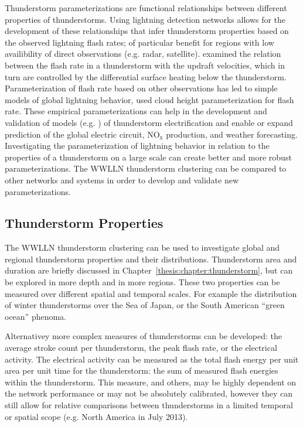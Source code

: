 Thunderstorm parameterizations are functional relationships between different properties of thunderstorms.
Using lightning detection networks allows for the development of these relationships that infer thunderstorm properties based on the observed lightning flash rates; of particular benefit for regions with low availibility of direct observations (e.g. radar, satellite).
\citet{Zipser1994} examined the relation between the flash rate in a thunderstorm with the updraft velocities, which in turn are controlled by the differential surface heating below the thunderstorm.
Parameterization of flash rate based on other observations has led to simple models of global lightning behavior, \citet{Price1992} used cloud height parameterization for flash rate.
These empirical parameterizations can help in the development and validation of models (e.g. \citet{Baker1999}) of thunderstorm electrification and enable or expand prediction of the global electric circuit, NO$_\text{x}$ production, and weather forecasting.
Investigating the parameterization of lightning behavior in relation to the properties of a thunderstorm on a large scale can create better and more robust parameterizations.
The WWLLN thunderstorm clustering can be compared to other networks and systems in order to develop and validate new parameterizations.

\subsection{Thunderstorm Properties}

The WWLLN thunderstorm clustering can be used to investigate global and regional thunderstorm properties and their distributions.
Thunderstorm area and duration are briefly discussed in Chapter~\ref{thesis:chapter:thunderstorm}, but can be explored in more depth and in more regions.
These two properties can be measured over different spatial and temporal scales.
For example the distribution of winter thunderstorms over the Sea of Japan, or the South American ``green ocean'' phenoma.

Alternativey more complex measures of thunderstorms can be developed: the average stroke count per thunderstorm, the peak flash rate, or the electrical activity.
The electrical activity can be measured as the total flash energy per unit area per unit time for the thunderstorm: the sum of measured flash energies within the thunderstorm.
This measure, and others, may be highly dependent on the network performance or may not be absolutely calibrated, however they can still allow for relative comparisons between thunderstorms in a limited temporal or spatial scope (e.g. North America in July 2013).


